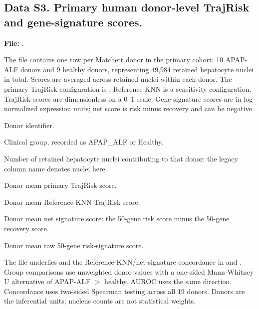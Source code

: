 \Needspace{135pt}
\subsection*{Data S3. Primary human donor-level TrajRisk and gene-signature scores.}
\label{data:S3}
\noindent\textbf{File:} .\par\smallskip
\noindent The file contains one row per Matchett donor in the primary cohort: 10 APAP-ALF donors and 9 healthy donors, representing 49,984 retained hepatocyte nuclei in total. Scores are averaged across retained nuclei within each donor. The primary TrajRisk configuration is \SelfOnly{}; Reference-KNN is a sensitivity configuration. TrajRisk scores are dimensionless on a 0--1 scale. Gene-signature scores are in log-normalized expression units; net score is risk minus recovery and can be negative.\par\smallskip
\begin{description}
\setlength{\itemsep}{1pt}\setlength{\parsep}{0pt}
\item[\texttt{patient\_id}] Donor identifier.
\item[\texttt{condition}] Clinical group, recorded as APAP\_ALF or Healthy.
\item[\texttt{n\_cells}] Number of retained hepatocyte nuclei contributing to that donor; the legacy column name denotes nuclei here.
\item[\texttt{risk\_2a}] Donor mean primary \SelfOnly{} TrajRisk score.
\item[\texttt{risk\_2b}] Donor mean Reference-KNN TrajRisk score.
\item[\texttt{sig\_net}] Donor mean net signature score: the 50-gene risk score minus the 50-gene recovery score.
\item[\texttt{sig\_risk}] Donor mean raw 50-gene risk-signature score.
\end{description}
\noindent The file underlies  and the Reference-KNN/net-signature concordance in  and . Group comparisons use unweighted donor values with a one-sided Mann-Whitney U alternative of APAP-ALF \(>\) healthy. AUROC uses the same direction. Concordance uses two-sided Spearman testing across all 19 donors. Donors are the inferential units; nucleus counts are not statistical weights.\par\medskip

\Needspace{135pt}

